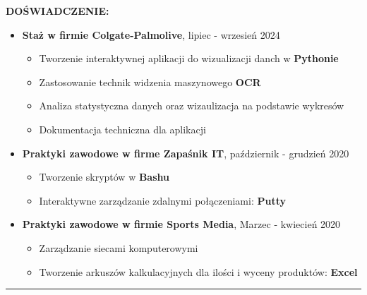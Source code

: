 \documentclass[10pt]{article}
\begin{document}
\noindent \fontsize{14pt}{14pt}\selectfont \textbf{\color{Violet}DOŚWIADCZENIE:}
\fontsize{10pt}{10pt}\selectfont
\begin{itemize}[leftmargin=*]
    \item \textbf{Staż w firmie Colgate-Palmolive}, lipiec - wrzesień 2024
    \begin{itemize}
        \item Tworzenie interaktywnej aplikacji do wizualizacji danch w \textbf{Pythonie}
        \item Zastosowanie technik widzenia maszynowego \textbf{OCR} 
        \item Analiza statystyczna danych oraz wizaulizacja na podstawie wykresów
        \item Dokumentacja techniczna dla aplikacji
    \end{itemize}
    \item \textbf{Praktyki zawodowe w firme Zapaśnik IT}, październik - grudzień 2020
    \begin{itemize}
        \item Tworzenie skryptów w \textbf{Bashu} 
        \item Interaktywne zarządzanie zdalnymi połączeniami: \textbf{Putty}
    \end{itemize}
    \item \textbf{Praktyki zawodowe w firmie Sports Media}, Marzec - kwiecień 2020
    \begin{itemize}
        \item Zarządzanie siecami komputerowymi
        \item Tworzenie arkuszów kalkulacyjnych dla ilości i wyceny produktów: \textbf{Excel}
    \end{itemize}
\end{itemize}

\rule{17cm}{1pt} \\
\end{document}
